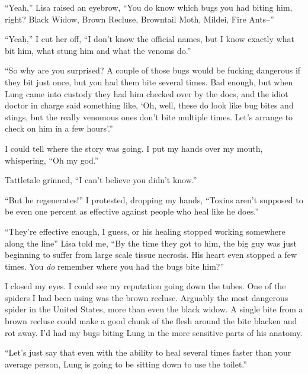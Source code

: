 ``Yeah,'' Lisa raised an eyebrow, ``You do know which bugs you had biting him, right?  Black Widow, Brown Recluse, Browntail Moth, Mildei, Fire Ants--''



``Yeah,'' I cut her off, ``I don't know the official names, but I know exactly what bit him, what stung him and what the venoms do.''



``So why are you surprised?  A couple of those bugs would be fucking dangerous if they bit just once, but you had them bite several times.  Bad enough, but when Lung came into custody they had him checked over by the docs, and the idiot doctor in charge said something like, `Oh, well, these do look like bug bites and stings, but the really venomous ones don't bite multiple times.  Let's arrange to check on him in a few hours'.''



I could tell where the story was going.  I put my hands over my mouth, whispering, ``Oh my god.''



Tattletale grinned, ``I can't believe you didn't know.''



``But he regenerates!'' I protested, dropping my hands, ``Toxins aren't supposed to be even one percent as effective against people who heal like he does.''



``They're effective enough, I guess, or his healing stopped working somewhere along the line'' Lisa told me, ``By the time they got to him, the big guy was just beginning to suffer from large scale tissue necrosis.  His heart even stopped a few times.  You \emph{do} remember where you had the bugs bite him?''



I closed my eyes.  I could see my reputation going down the tubes.  One of the spiders I had been using was the brown recluse.  Arguably the most dangerous spider in the United States, more than even the black widow.  A single bite from a brown recluse could make a good chunk of the flesh around the bite blacken and rot away.  I'd had my bugs biting Lung in the more sensitive parts of his anatomy.



``Let's just say that even with the ability to heal several times faster than your average person, Lung is going to be sitting down to use the toilet.''



